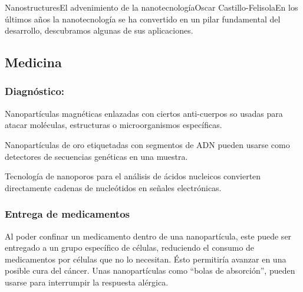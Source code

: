 \begin{article}{Nanostructures}{El advenimiento de la nanotecnolog\'ia}{Oscar Castillo-Felisola}{En los \'ultimos a\~nos la nanotecnolog\'ia se ha convertido en un pilar fundamental del desarrollo, descubramos algunas de sus aplicaciones.}
\subsection{Medicina}
\subsubsection*{Diagn\'ostico:}


Nanopart\'iculas magn\'eticas enlazadas con ciertos anti-cuerpos so usadas para atacar mol\'eculas, estructuras o microorganismos  espec\'ificas.

Nanopart\'iculas de oro etiquetadas con segmentos de ADN pueden usarse como detectores de secuencias gen\'eticas en una muestra.

Tecnolog\'ia de nanoporos para el an\'alisis de \'acidos nucleicos convierten directamente cadenas de nucle\'otidos en se\~nales electr\'onicas.






\subsubsection*{Entrega de medicamentos}


Al poder confinar un medicamento dentro de una nanopart\'icula, este puede ser entregado a un grupo espec\'ifico de c\'elulas, reduciendo el consumo de medicamentos por c\'elulas que no lo necesitan. \'Esto permitir\'ia avanzar en una posible %
cura del c\'ancer.
Unas nanopart\'iculas como ``bolas de absorci\'on'', pueden usarse para interrumpir la respuesta al\'ergica. 


\end{article}
